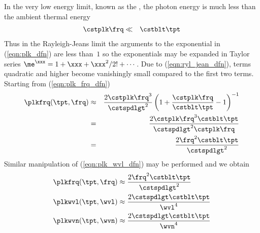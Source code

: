 \documentclass[12pt]{article}
\begin{document}
In the very low energy limit, known as the , the photon energy is much less than the ambient thermal energy 
\begin{eqnarray}
\cstplk \frq & \ll & \cstblt \tpt
\label{eqn:ryl_jean_dfn}
\end{eqnarray}
Thus in the Rayleigh-Jeans limit the arguments to the exponential in
(\ref{eqn:plk_dfn}) are less than~$1$ so the exponentials may be
expanded in Taylor series
$\me^{\xxx} = 1 + \xxx + \xxx^{2}/2! + \cdots$.
Due to (\ref{eqn:ryl_jean_dfn}), terms quadratic and higher become
vanishingly small compared to the first two terms.
Starting from (\ref{eqn:plk_frq_dfn}) 
\begin{eqnarray}
\plkfrq(\tpt,\frq) & \approx & 
\frac{2 \cstplk \frq^{3}}{\cstspdlgt^{2}}
\left(1 + \frac{\cstplk \frq}{\cstblt \tpt} -1 \right)^{-1}
\nonumber \\
& = & 
\frac{2 \cstplk \frq^{3} \cstblt \tpt}{\cstspdlgt^{2} \cstplk \frq}
\nonumber \\
& = & 
\frac{2 \frq^{2} \cstblt \tpt}{\cstspdlgt^{2}}
\end{eqnarray}
Similar manipulation of (\ref{eqn:plk_wvl_dfn}) may be performed 
and we obtain
\begin{subequations}
\label{eqn:plk_ryl_jean_dfn}
\begin{align}
\label{eqn:plk_frq_ryl_jean_dfn}
\plkfrq(\tpt,\frq) & \approx  
\frac{2 \frq^{2} \cstblt \tpt}{\cstspdlgt^{2} } \\
\label{eqn:plk_wvl_ryl_jean_dfn}
\plkwvl(\tpt,\wvl) & \approx  
\frac{2 \cstspdlgt \cstblt \tpt}{\wvl^{4}} \\
\label{eqn:plk_wvn_ryl_jean_dfn}
\plkwvn(\tpt,\wvn) & \approx  
\frac{2 \cstspdlgt \cstblt \tpt}{\wvn^{4}}
\end{align}
\end{subequations}
\end{document}
